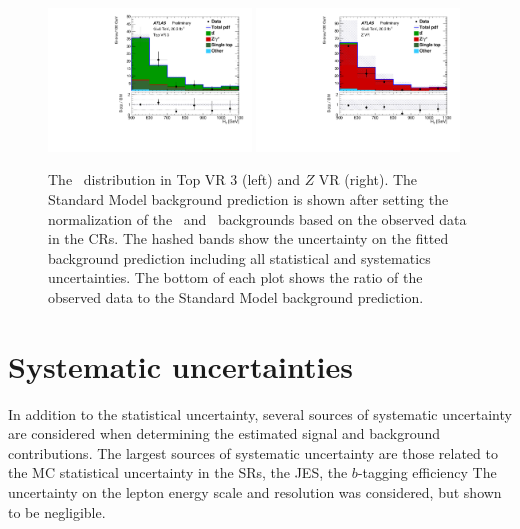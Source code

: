 \begin{figure}
  \centering
  \includegraphics[width=0.48\textwidth]{figs/blstop/vr_top_3_ht_signal.pdf}
  \includegraphics[width=0.48\textwidth]{figs/blstop/vr_Z_ht_signal.pdf}
  \caption{The \HT\ distribution in Top VR 3 (left) and $Z$ VR (right).
    The Standard Model background prediction is shown after setting the
    normalization of the \TTBAR\ and \ZGAMMAJETS\ backgrounds based on the
    observed data in the CRs.
    The hashed bands show the uncertainty on the fitted background prediction
    including all statistical and systematics uncertainties.
    The bottom of each plot shows the ratio of the observed data to the
    Standard Model background prediction.
  }
  \label{fig:ht_vr}
\end{figure}


\FloatBarrier
\section{Systematic uncertainties}
\label{sec:systematics}

In addition to the statistical uncertainty, several sources of systematic
uncertainty are considered when determining the estimated signal and background
contributions.
The largest sources of systematic uncertainty are those related to the
MC statistical uncertainty in the SRs, the JES, the $b$-tagging efficiency
The uncertainty on the lepton energy scale and resolution was considered,
but shown to be negligible.

